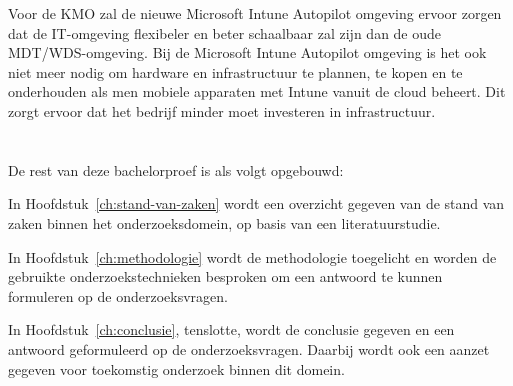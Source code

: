 Voor de KMO zal de nieuwe Microsoft Intune Autopilot omgeving ervoor zorgen dat de IT-omgeving flexibeler en beter schaalbaar zal zijn dan de oude MDT/WDS-omgeving. Bij de Microsoft Intune Autopilot omgeving is het ook niet meer nodig om hardware en infrastructuur te plannen, te kopen en te onderhouden als men mobiele apparaten met Intune vanuit de cloud beheert. Dit zorgt ervoor dat het bedrijf minder moet investeren in infrastructuur.


\section{}
\label{sec:opzet-bachelorproef}


De rest van deze bachelorproef is als volgt opgebouwd:

In Hoofdstuk~\ref{ch:stand-van-zaken} wordt een overzicht gegeven van de stand van zaken binnen het onderzoeksdomein, op basis van een literatuurstudie.

In Hoofdstuk~\ref{ch:methodologie} wordt de methodologie toegelicht en worden de gebruikte onderzoekstechnieken besproken om een antwoord te kunnen formuleren op de onderzoeksvragen.


In Hoofdstuk~\ref{ch:conclusie}, tenslotte, wordt de conclusie gegeven en een antwoord geformuleerd op de onderzoeksvragen. Daarbij wordt ook een aanzet gegeven voor toekomstig onderzoek binnen dit domein.